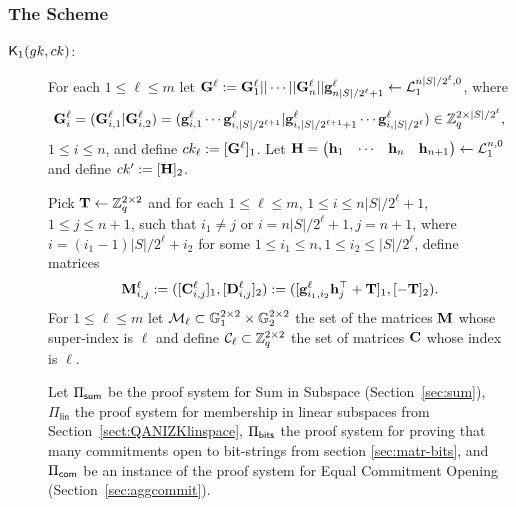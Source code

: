 \subsubsection{The Scheme}

\begin{description}

\item[{$\mathsf{K}_1({gk}, ck)$}:]
For each $1\leq \ell\leq m$ let $\mathbf{{G}}^\ell:=\mathbf{{G}}^\ell_1||\cdots||\mathbf{{G}}^\ell_n||\mathbf{g}^\ell_{n|S|/2^\ell+1}\gets\mathcal{L}_1^{n|S|/2^\ell,0}$, where
$$\mathbf{{G}}^\ell_i=
(\mathbf{{G}}^\ell_{i,1}|\mathbf{{G}}^\ell_{i,2})
=
(\mathbf{g}^\ell_{i,1}\cdots\mathbf{g}^\ell_{i,|S|/2^{\ell+1}}|\mathbf{g}^\ell_{i,|S|/2^{\ell+1}+1}\cdots\mathbf{g}^\ell_{i,|S|/2^\ell})
\in\mathbb{Z}_q^{2\times|S|/2^\ell},$$ $1\leq i\leq n$, and define $ck_\ell:=[\mathbf{{G}}^\ell]_1$.
Let $\mathbf{{H}}=\begin{pmatrix}\mathbf{h}_1&\cdots&\mathbf{h}_n&\mathbf{h}_{n+1}\end{pmatrix}\gets\mathcal{L}_1^{n,0}$ and define $ck':=[\mathbf{{H}}]_2$. 

Pick $\mathbf{{T}}\gets\mathbb{Z}_q^{2\times 2}$ and for each $1\leq \ell\leq m$, $1\leq i \leq n|S|/2^\ell+1$, $1\leq j\leq n+1$, such that $i_1\neq j$ or $i=n|S|/2^\ell+1,j=n+1$, where $i=(i_1-1)|S|/2^\ell+i_2$ for some $1\leq i_1\leq n,1\leq i_2 \leq |S|/2^\ell$, define matrices
$$\mathbf{{M}}^\ell_{i,j}:=([\mathbf{{C}}_{i,j}^\ell]_1,[\mathbf{{D}}_{i,j}^\ell]_2):=([\mathbf{g}_{i_1,i_2}^\ell\mathbf{h}_j^{\top}+\mathbf{{T}}]_1,[-\mathbf{{T}}]_2).$$ For $1\leq \ell\leq m$ let $\mathcal{M}_\ell\subset\mathbb{G}_1^{2\times 2}\times\mathbb{G}_2^{2\times 2}$ the set of the matrices $\mathbf{{M}}$ whose super-index is $\ell$ and define $\mathcal{C}_\ell\subset\mathbb{Z}_q^{2\times 2}$ the set of matrices $\mathbf{{C}}$ whose index is $\ell$.

Let $\Pi_{\mathsf{sum}}$ be the proof system for Sum in Subspace 
(Section~\ref{sec:sum}), $\Pi_\mathsf{lin}$ the proof system for membership in linear subspaces from Section~\ref{sect:QANIZKlinspace}, $\Pi_{\mathsf{bits}}$ the proof system for proving that many commitments open to bit-strings from section \ref{sec:matr-bits}, and $\Pi_{\mathsf{com}}$
be an instance of the proof system for Equal Commitment Opening (Section~\ref{sec:aggcommit}).


\end{description}
